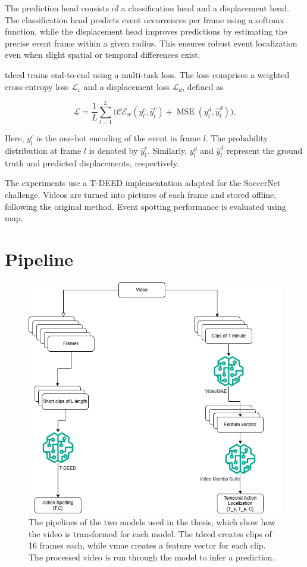 The prediction head consists of a classification head and a displacement head. The classification head predicts event occurrences per frame using a softmax function, while the displacement head improves predictions by estimating the precise event frame within a given radius. This ensures robust event localization even when slight spatial or temporal differences exist.


\acrshort{tdeed} trains end-to-end using a multi-task loss. The loss comprises a weighted cross-entropy loss \(\mathcal{L}_c\) and a displacement loss \(\mathcal{L}_d\), defined as

\[
\mathcal{L} = \frac{1}{L}\sum_{l=1}^{L}\Big(\mathcal{CE}_{w}(y_l^{c},\hat{y}_l^c) + \operatorname{MSE}(y_l^{d},\hat{y}_l^d)\Big).
\]

Here, \(y_l^{c}\) is the one-hot encoding of the event in frame \(l\). The probability distribution at frame \(l\) is denoted by \(\hat{y}_l^c\). Similarly, \(y_l^{d}\) and \(\hat{y}_l^d\) represent the ground truth and predicted displacements, respectively.

The experiments use a T-DEED implementation adapted for the SoccerNet challenge. Videos are turned into pictures of each frame and stored offline, following the original method. Event spotting performance is evaluated using \acrlong{map}.


\section{Pipeline} 

\begin{figure}
    \centering
    \includegraphics[width=0.75\linewidth]{figures/pipeline.png}
    \caption{The pipelines of the two models used in the thesis, which show how the video is transformed for each model. The \acrshort{tdeed} creates clips of 16 frames each, while \acrshort{vmae} creates a feature vector for each clip. The processed video is run through the model to infer a prediction.}
    \label{fig:pipeline}
\end{figure}

